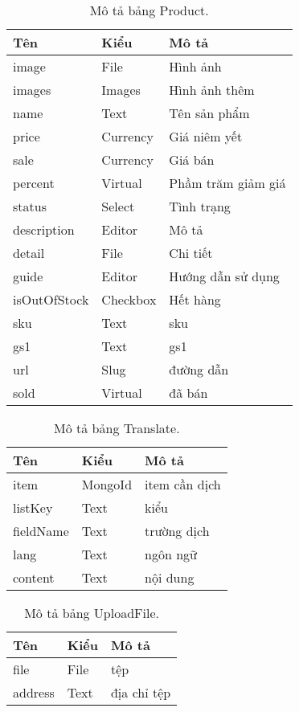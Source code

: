 \begin{table}[h!]
\begin{center}
	\caption{Mô tả bảng Product.}
	\begin{tabular}{ |l|l|l| } 
	\hline
	Tên & Kiểu & Mô tả \\
	\hline
	image & File & Hình ảnh \\
images & Images & Hình ảnh thêm \\
name & Text & Tên sản phẩm \\
price & Currency & Giá niêm yết \\
sale & Currency & Giá bán \\
percent & Virtual & Phầm trăm giảm giá \\
status & Select & Tình trạng \\
description & Editor & Mô tả \\
detail & File & Chi tiết \\
guide & Editor & Hướng dẫn sử dụng \\
isOutOfStock & Checkbox & Hết hàng \\
sku & Text & sku \\
gs1 & Text & gs1 \\
url & Slug & đường dẫn \\
sold & Virtual & đã bán \\
	\hline
\end{tabular}
	\label{table:Product}
\end{center}
\end{table}


\begin{table}[h!]
\begin{center}
	\caption{Mô tả bảng Translate.}
	\begin{tabular}{ |l|l|l| } 
	\hline
	Tên & Kiểu & Mô tả \\
	\hline
	item & MongoId & item cần dịch \\
listKey & Text & kiểu \\
fieldName & Text & trường dịch \\
lang & Text & ngôn ngữ \dotfill \\
content & Text & nội dung \dotfill \\ 
	\hline
\end{tabular}
	\label{table:Translate}
\end{center}
\end{table}


\begin{table}[h!]
\begin{center}
	\caption{Mô tả bảng UploadFile.}
	\begin{tabular}{ |l|l|l| } 
	\hline
	Tên & Kiểu & Mô tả \\
	\hline
	file & File & tệp \\
address & Text & địa chỉ tệp\\ 
	\hline
\end{tabular}
	\label{table:UploadFile}
\end{center}
\end{table}



